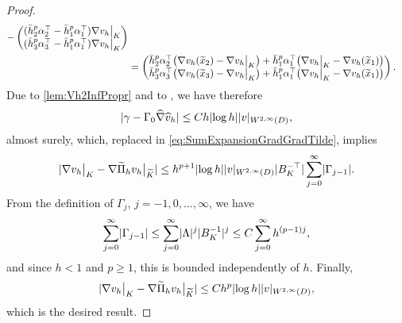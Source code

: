 \begin{proof}
\begin{equation}
\begin{aligned}
	- \begin{pmatrix} (\bar h_2^p \alpha_2^\top - \bar h_1^p \alpha_1^\top) \nabla v_h \bigr\rvert_{K} \\ (\bar h_3^p \alpha_3^\top - \bar h_1^p \alpha_1^\top) \nabla v_h \bigr\rvert_{K} \end{pmatrix}\\
	&= \begin{pmatrix} \bar h_2^p \alpha_2^\top \big(\nabla v_h(\widetilde x_2) - \nabla v_h \bigr\rvert_{K}\big) + \bar h_1^p \alpha_1^\top \big(\nabla v_h \bigr\rvert_{K} - \nabla v_h(\widetilde x_1)\big) \\
					   \bar h_3^p \alpha_3^\top \big(\nabla v_h(\widetilde x_3) - \nabla v_h \bigr\rvert_{K}\big) + \bar h_1^p \alpha_1^\top \big(\nabla v_h \bigr\rvert_{K} - \nabla v_h(\widetilde x_1)\big) \end{pmatrix}.                
\end{aligned}
\end{equation}	
Due to \cref{lem:Vh2InfPropr} and to , we have therefore
\begin{equation}
	\lvert\gamma - \Gamma_0 \widehat \nabla \widehat v_h\rvert \leq Ch \lvert\log h\rvert\lvert v\rvert_{W^{2, \infty}(D)},
\end{equation}
almost surely, which, replaced in \eqref{eq:SumExpansionGradGradTilde}, implies 
\begin{equation}
	\lvert\nabla v_h\bigr\rvert_{K} - \nabla \widetilde \Pi_h v_h \bigr\rvert_{\widetilde K}\rvert \leq h^{p+1}\lvert\log h\rvert\lvert v\rvert_{W^{2, \infty}(D)} \lvert B_K^{-\top}\rvert \sum_{j=0}^{\infty}\lvert\Gamma_{j-1}\rvert.
\end{equation}
From the definition of $\Gamma_j$, $j = -1, 0, \ldots, \infty$, we have
\begin{equation}
	\sum_{j=0}^{\infty} \lvert\Gamma_{j-1}\rvert \leq \sum_{j=0}^{\infty} \lvert\Lambda\rvert^j \lvert B_K^{-1}\rvert^j \leq C \sum_{j=0}^\infty h^{(p-1)j},
\end{equation}
and since $h < 1$ and $p \geq 1$, this is bounded independently of $h$. Finally,
\begin{equation}
	\lvert\nabla v_h\bigr\rvert_{K} - \nabla \widetilde \Pi_h v_h \bigr\rvert_{\widetilde K}\rvert \leq C h^p \lvert\log h\rvert \lvert v\rvert_{W^{2, \infty}(D)},
\end{equation}
which is the desired result.
\end{proof}

